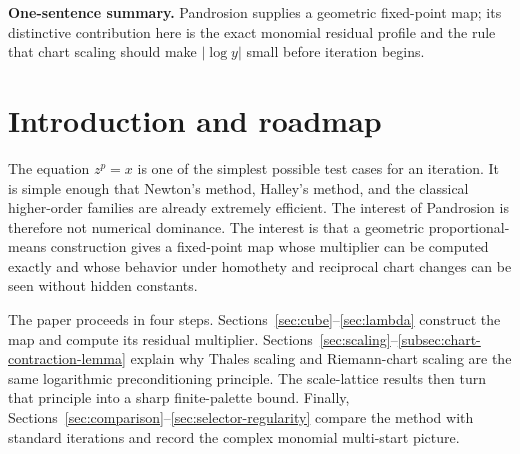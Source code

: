 \documentclass[10pt,a4paper]{article}
\theoremstyle{plain}
\theoremstyle{definition}
\theoremstyle{remark}
\newenvironment{takeaway}{%
  \begin{center}\begin{minipage}{0.92\linewidth}\small\itshape\color{blue!45!black}%
}{%
  \end{minipage}\end{center}%
}
\begin{document}
\begin{abstract}
Finally, Aitken--Steffensen acceleration turns the linearly convergent map into
a derivative-free quadratically convergent map, with an explicit local error
constant.  The complex monomial extension is kept at the level needed for an
expository account: cyclotomic anchors, local seeding disks, and a finite
selector.  The result is a deliberately narrow but coherent account of the
Pandrosion monomial scheme: fixed point, contraction, scaling, reciprocal
charts, acceleration, and complex roots.
\end{abstract}

\begin{takeaway}
\textbf{One-sentence summary.}
Pandrosion supplies a geometric fixed-point map; its distinctive contribution here is the exact monomial residual profile and the rule that chart scaling should make $|\log y|$ small before iteration begins.
\end{takeaway}


\section{Introduction and roadmap}
\label{sec:intro}

The equation $z^p=x$ is one of the simplest possible test cases for an
iteration.  It is simple enough that Newton's method, Halley's method, and the
classical higher-order families are already extremely efficient.  The interest
of Pandrosion is therefore not numerical dominance.  The interest is that a
geometric proportional-means construction gives a fixed-point map whose
multiplier can be computed exactly and whose behavior under homothety and
reciprocal chart changes can be seen without hidden constants.

The paper proceeds in four steps.  Sections~\ref{sec:cube}--\ref{sec:lambda}
construct the map and compute its residual multiplier.  Sections~\ref{sec:scaling}--\ref{subsec:chart-contraction-lemma}
explain why Thales scaling and Riemann-chart scaling are the same logarithmic
preconditioning principle.  The scale-lattice results then turn that principle
into a sharp finite-palette bound.  Finally, Sections~\ref{sec:comparison}--\ref{sec:selector-regularity}
compare the method with standard iterations and record the complex monomial
multi-start picture.

\end{document}
